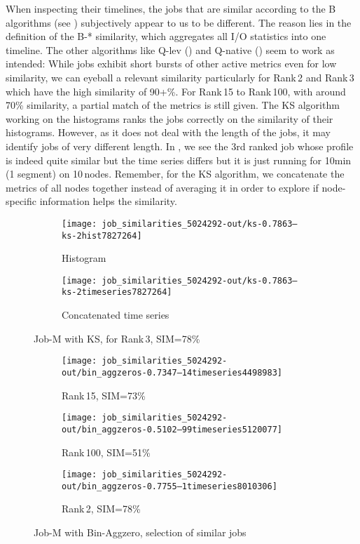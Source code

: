 \documentclass{jhps}
\begin{document}
When inspecting their timelines, the jobs that are similar according to the B algorithms (see ) subjectively appear to us to be different. 
The reason lies in the definition of the B-* similarity, which aggregates all I/O statistics into one timeline.
The other algorithms like Q-lev () and Q-native () seem to work as intended:
While jobs exhibit short bursts of other active metrics even for low similarity, we can eyeball a relevant similarity particularly for Rank\,2 and Rank\,3 which have the high similarity of 90+\%. For Rank\,15 to Rank\,100, with around 70\% similarity, a partial match of the metrics is still given.
The KS algorithm working on the histograms ranks the jobs correctly on the similarity of their histograms.
However, as it does not deal with the length of the jobs, it may identify jobs of very different length.
In , we see the 3rd ranked job whose profile is indeed quite similar but the time series differs but it is just running for 10min (1 segment) on 10\,nodes.
Remember, for the KS algorithm, we concatenate the metrics of all nodes together instead of averaging it in order to explore if node-specific information helps the similarity.

\begin{figure}[bt]
\begin{subfigure}{0.5\textwidth}
\centering
\texttt{[image: job\_similarities\_5024292-out/ks-0.7863--ks-2hist7827264]}
\caption{Histogram}
\end{subfigure}
\qquad
\begin{subfigure}{0.36\textwidth}
\centering
\texttt{[image: job\_similarities\_5024292-out/ks-0.7863--ks-2timeseries7827264]}
\caption{Concatenated time series}
\end{subfigure}

\caption{Job-M with KS, for Rank\,3, SIM=78\%}%
\label{fig:job-M-ks}
\end{figure}




\begin{figure}[bt]
\begin{subfigure}{0.47\textwidth}
\centering
\texttt{[image: job\_similarities\_5024292-out/bin\_aggzeros-0.7347--14timeseries4498983]}
\caption{Rank\,15, SIM=73\%}
\end{subfigure}
\begin{subfigure}{0.47\textwidth}
\centering
\texttt{[image: job\_similarities\_5024292-out/bin\_aggzeros-0.5102--99timeseries5120077]}
\caption{Rank\,100, SIM=51\% }
\end{subfigure}

\begin{subfigure}{0.47\textwidth}
\centering
\texttt{[image: job\_similarities\_5024292-out/bin\_aggzeros-0.7755--1timeseries8010306]}
\caption{Rank\,2, SIM=78\%}
\end{subfigure}
\caption{Job-M with Bin-Aggzero, selection of similar jobs}%
\label{fig:job-M-bin-aggzero}
\end{figure}
\end{document}
